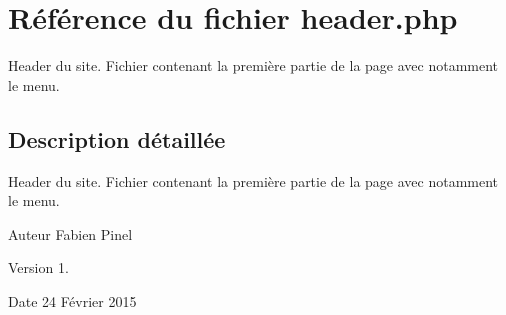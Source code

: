 \hypertarget{header_8php}{\section{Référence du fichier header.\-php}
\label{header_8php}
}


Header du site. Fichier contenant la première partie de la page avec notamment le menu.  




\subsection{Description détaillée}
Header du site. Fichier contenant la première partie de la page avec notamment le menu. \begin{DoxyAuthor}{Auteur}
Fabien Pinel 
\end{DoxyAuthor}
\begin{DoxyVersion}{Version}
1. 
\end{DoxyVersion}
\begin{DoxyDate}{Date}
24 Février 2015 
\end{DoxyDate}
